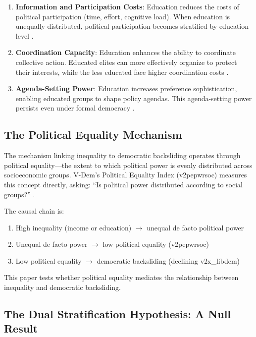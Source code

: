 \documentclass[11pt,letterpaper]{article}
\begin{document}
\begin{enumerate}
  \item \textbf{Information and Participation Costs}: Education reduces the costs of political participation (time, effort, cognitive load). When education is unequally distributed, political participation becomes stratified by education level \cite{Brady1995}.

  \item \textbf{Coordination Capacity}: Education enhances the ability to coordinate collective action. Educated elites can more effectively organize to protect their interests, while the less educated face higher coordination costs \cite{Olson1965}.

  \item \textbf{Agenda-Setting Power}: Education increases preference sophistication, enabling educated groups to shape policy agendas. This agenda-setting power persists even under formal democracy \cite{Page1983}.
\end{enumerate}

\subsection{The Political Equality Mechanism}

The mechanism linking inequality to democratic backsliding operates through political equality---the extent to which political power is evenly distributed across socioeconomic groups. V-Dem's Political Equality Index (v2pepwrsoc) measures this concept directly, asking: ``Is political power distributed according to social groups?'' \cite{Coppedge2011}.

The causal chain is:
\begin{enumerate}
  \item High inequality (income or education) $\rightarrow$ unequal de facto political power
  \item Unequal de facto power $\rightarrow$ low political equality (v2pepwrsoc)
  \item Low political equality $\rightarrow$ democratic backsliding (declining v2x\_libdem)
\end{enumerate}

This paper tests whether political equality mediates the relationship between inequality and democratic backsliding.

\subsection{The Dual Stratification Hypothesis: A Null Result}
\end{document}
